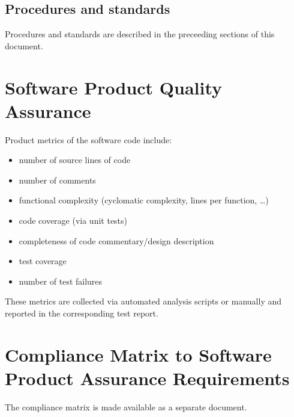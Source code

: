 \section{Procedures and standards}

Procedures and standards are described in the preceeding sections of this
document.




\chapter{Software Product Quality Assurance}


Product metrics of the software code include:

\begin{itemize}
	\item number of source lines of code
	\item number of comments
	\item functional complexity (cyclomatic complexity, lines per function, \ldots)
	\item code coverage (via unit tests)
	\item completeness of code commentary/design description
	\item test coverage
	\item number of test failures
\end{itemize}

\noindent
These metrics are collected via automated analysis scripts or manually and
reported in the corresponding test report.



\chapter{Compliance Matrix to Software Product Assurance Requirements}

The compliance matrix is made available as a separate document.






